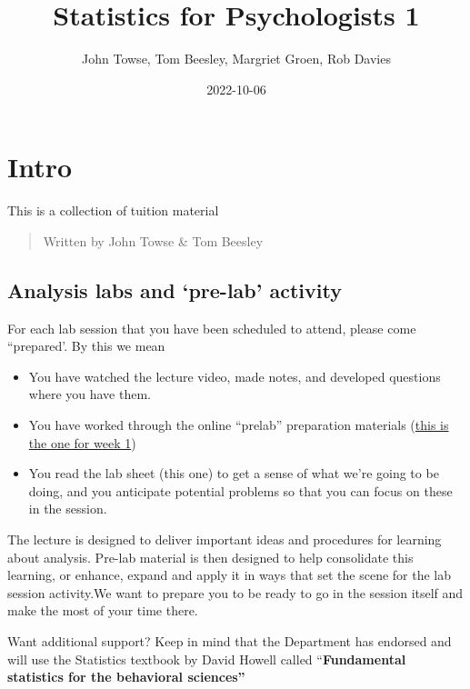 \documentclass[
]{book}
\title{Statistics for Psychologists 1}
\author{John Towse, Tom Beesley, Margriet Groen, Rob Davies}
\date{2022-10-06}
\begin{document}
\maketitle

{
\setcounter{tocdepth}{1}
\tableofcontents
}
\hypertarget{intro}{%
\chapter{Intro}\label{intro}}

This is a collection of tuition material

\begin{quote}
Written by John Towse \& Tom Beesley
\end{quote}

\hypertarget{analysis-labs-and-pre-lab-activity}{%
\section{Analysis labs and `pre-lab' activity}\label{analysis-labs-and-pre-lab-activity}}

For each lab session that you have been scheduled to attend, please come
``prepared'. By this we mean

\begin{itemize}
\item
  You have watched the lecture video, made notes, and developed questions where you have them.
\item
  You have worked through the online ``prelab'' preparation materials
  (\href{https://ma-rconnect.lancs.ac.uk/Week_1_prep}{this is the one for week
  1})
\item
  You read the lab sheet (this one) to get a sense of what we're going to be doing, and you anticipate potential problems so that you can focus on these in the session.
\end{itemize}

The lecture is designed to deliver important ideas and procedures for learning about analysis. Pre-lab material is then designed to help consolidate this learning, or enhance, expand and apply it in ways that set the scene for the lab session activity.We want to prepare you to be ready to go in the session itself and make the most of your time there.

Want additional support? Keep in mind that the Department has endorsed and will use the Statistics textbook by David Howell called
``\textbf{Fundamental statistics for the behavioral sciences''}
\end{document}
